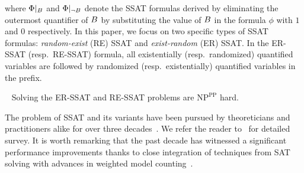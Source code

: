 where $ \Phi|_{B} $ and $ \Phi|_{\neg B} $ denote the SSAT formulas derived by eliminating the outermost quantifier of $ B $  by substituting the value of $ B $ in the formula $ \phi $ with $ 1 $ and $ 0 $ respectively. In this paper, we focus on two specific types of SSAT formulas:  \textit{random-exist} (RE) SSAT and \textit{exist-random} (ER) SSAT. In the ER-SSAT (resp.\ RE-SSAT) formula, all existentially (resp.\ randomized) quantified variables are followed by randomized (resp.\ existentially) quantified variables in the prefix.
\begin{lemma}{~\cite{littman2001stochastic}}
	\label{fairness_justicia_thm:complexity}
	Solving the ER-SSAT and RE-SSAT problems are $\mathrm{NP}^{\mathrm{PP}}$ hard.
\end{lemma}

The problem of SSAT and its variants have been pursued by theoreticians and practitioners alike for over three decades~\cite{majercik2005dc,fremont2017maximum,huang2006combining}. We refer the reader to~\cite{lee2017solving,lee2018solving} for detailed survey. It is worth remarking that the past decade has witnessed a significant performance improvements thanks to close integration of techniques from SAT solving with advances in weighted model counting~\cite{sang2004combining,chakraborty2013scalable,chakraborty2014distribution}. 








